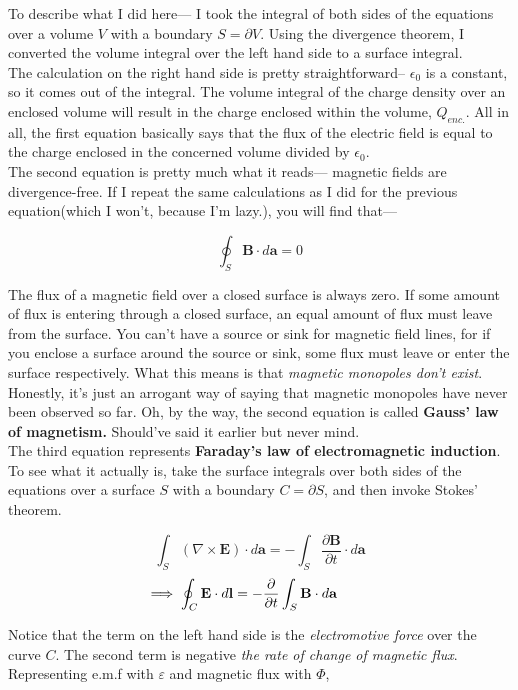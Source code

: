 \documentclass[12pt]{article}
\begin{document}
To describe what I did here--- I took the integral of both sides of the equations over a volume $V$ with a boundary $S = \partial V$. Using 
the divergence theorem, I converted the volume integral over the left hand side to a surface integral.\\
The calculation on the right hand side is pretty straightforward-- $\epsilon_0$ is a constant, so it comes out of the integral. The volume integral 
of the charge density over an enclosed volume will result in the charge enclosed within the volume, $Q_{enc.}$. 
All in all, the first equation basically says that the flux of the electric field is equal to the charge enclosed in the concerned volume divided by $\epsilon_0$. \\ The second equation is pretty much what it reads--- magnetic fields are divergence-free. If I repeat the same calculations as I did for the previous equation(which I won't, because I'm lazy.), 
you will find that---

\[\oint_S \mathbf{B}\cdot d\mathbf{a}=0\]

The flux of a magnetic field over a closed surface is always zero. If some amount of flux is entering through a closed surface, an equal amount of flux must leave from the surface. 
You can't have a source or sink for magnetic field lines, for if you enclose a surface around the source or sink, some flux must leave or enter the surface respectively. 
What this means is that \textit{magnetic monopoles don't exist}. Honestly, it's just an arrogant way of saying that magnetic monopoles have never been observed so far. Oh, by the way, the second equation is called \textbf{Gauss' law of magnetism.} Should've said it earlier but never mind.\\

The third equation represents \textbf{Faraday's law of electromagnetic induction}. To see what it actually is, take the surface integrals over both sides of the equations over a surface $S$ with a boundary $C = \partial S$, and then invoke Stokes' theorem. 

\[\int_S (\nabla \times \mathbf{E})\cdot d\mathbf{a} = -\int_S\frac{\partial \mathbf{B}}{\partial t}\cdot d\mathbf{a}\]
\[\implies \oint_C \mathbf{E}\cdot d\mathbf{l} = -\frac{\partial}{\partial t}\int_S \mathbf{B}\cdot d\mathbf{a} \hspace{0.9cm}\]

Notice that the term on the left hand side is the \textit{electromotive force} over the curve $C$. The second term is negative \textit{the rate of change of magnetic flux}. 
Representing e.m.f with $\varepsilon$ and magnetic flux with $\Phi$, 
\end{document}
